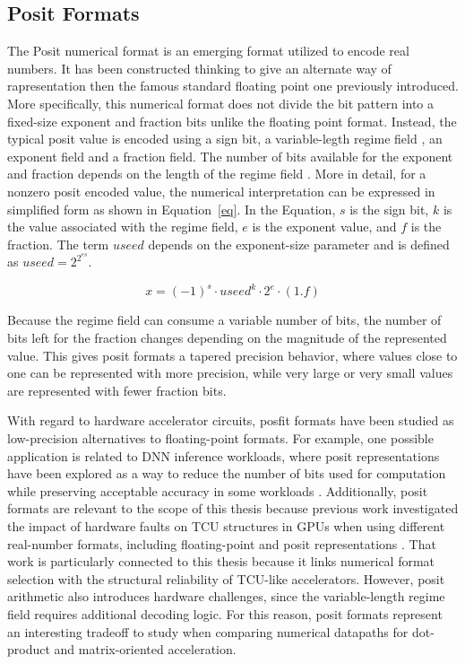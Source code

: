 \subsection{Posit Formats}

The Posit numerical format is an emerging format utilized to encode real numbers. It has been constructed thinking to give an alternate way of rapresentation then the famous standard floating point one previously introduced. More specifically, this numerical format does not divide the bit pattern into a fixed-size exponent and fraction bits unlike the floating point format. Instead, the typical posit value is encoded using a sign bit, a variable-legth regime field , an exponent field and a fraction field. The number of bits available for the exponent and fraction depends on the length of the regime field \cite{gustafson2017posit}. 
More in detail, for a nonzero posit encoded value, the numerical interpretation can be expressed in simplified form as shown in Equation~\eqref{eq}. In the Equation, $s$ is the sign bit, $k$ is the value associated with the regime field, $e$ is the exponent value, and $f$ is the fraction. The term $useed$ depends on the exponent-size parameter and is defined as $useed = 2^{2^{es}}$. 

\begin{equation}
x = (-1)^s \cdot useed^k \cdot 2^e \cdot (1.f)
\label{eq}
\end{equation}

Because the regime field can consume a variable number of bits, the number of bits left for the fraction changes depending on the magnitude of the represented value. This gives posit formats a tapered precision behavior, where values close to one can be represented with more precision, while very large or very small values are represented with fewer fraction bits.

With regard to hardware accelerator circuits, posfit formats have been studied as low-precision alternatives to floating-point formats. For example, one possible application is related to DNN inference workloads, where posit representations have been explored as a way to reduce the number of bits used for computation while preserving acceptable accuracy in some workloads \cite{carmichael2018deeppositron}. Additionally, posit formats are relevant to the scope of this thesis because previous work investigated the impact of hardware faults on TCU structures in GPUs when using different real-number formats, including floating-point and posit representations \cite{sierra2023realformatsreliability}. That work is particularly connected to this thesis because it links numerical format selection with the structural reliability of TCU-like accelerators. However, posit arithmetic also introduces hardware challenges, since the variable-length regime field requires additional decoding logic. For this reason, posit formats represent an interesting tradeoff to study when comparing numerical datapaths for dot-product and matrix-oriented acceleration.

